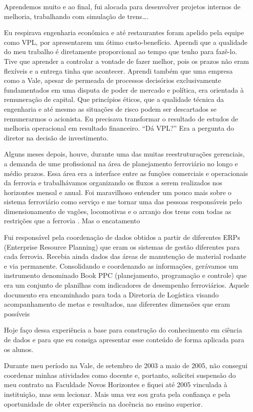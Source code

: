 \documentclass[
]{book}
\begin{document}
Aprendemos muito e ao final, fui alocada para desenvolver projetos
internos de melhoria, trabalhando com simulação de trens\ldots.

Eu respirava engenharia econômica e até restaurantes foram apelido pela
equipe como VPL, por apresentarem um ótimo custo-benefício. Aprendi que
a qualidade do meu trabalho é diretamente proporcional ao tempo que
tenho para fazê-lo. Tive que aprender a controlar a vontade de fazer
melhor, pois os prazos não eram flexíveis e a entrega tinha que
acontecer. Aprendi também que uma empresa como a Vale, apesar de
permeada de processos decisórios exclusivamente fundamentados em uma
disputa de poder de mercado e política, era orientada à remuneração de
capital. Que princípios éticos, que a qualidade técnica da engenharia e
até mesmo as situações de risco podem ser descartados se remunerarmos o
acionista. Eu precisava transformar o resultado de estudos de melhoria
operacional em resultado financeiro. ``Dá VPL?'' Era a pergunta do
diretor na decisão de investimento.

Alguns meses depois, houve, durante uma das muitas reestruturações
gerenciais, a demanda de ume profissional na área de planejamento
ferroviário no longo e médio prazos. Essa área era a interface entre as
funções comerciais e operacionais da ferrovia e trabalhávamos
organizando os fluxos a serem realizados nos horizontes mensal e anual.
Foi maravilhoso entender um pouco mais sobre o sistema ferroviário como
serviço e me tornar uma das pessoas responsáveis pelo dimensionamento de
vagões, locomotivas e o arranjo dos trens com todas as restrições que a
ferrovia . Mas o encatamento

Fui responsável pela coordenação de dados obtidos a partir de diferentes
ERPs (Enterprise Resource Planning) que eram os sistemas de gestão
diferentes para cada ferrovia. Recebia ainda dados das áreas de
manutenção de material rodante e via permanente. Consolidando e
coordenando as informações, gerávamos um instrumento denominado Book PPC
(planejamento, programação e controle) que era um conjunto de planilhas
com indicadores de desempenho ferroviários. Aquele documento era
encaminhado para toda a Diretoria de Logística visando acompanhamento de
metas e resultados, nas diferentes dimensões que eram possíveis

Hoje faço dessa experiência a base para construção do conhecimento em
ciência de dados e para que eu consiga apresentar esse conteúdo de forma
aplicada para os alunos.

Durante meu período na Vale, de setembro de 2003 a maio de 2005, não
consegui coordenar minhas atividades como docente e, portanto, solicitei
suspensão do meu contrato na Faculdade Novos Horizontes e fiquei até
2005 vinculada à instituição, mas sem lecionar. Mais uma vez sou grata
pela confiança e pela oportunidade de obter experiência na docência no
ensino superior.
\end{document}
